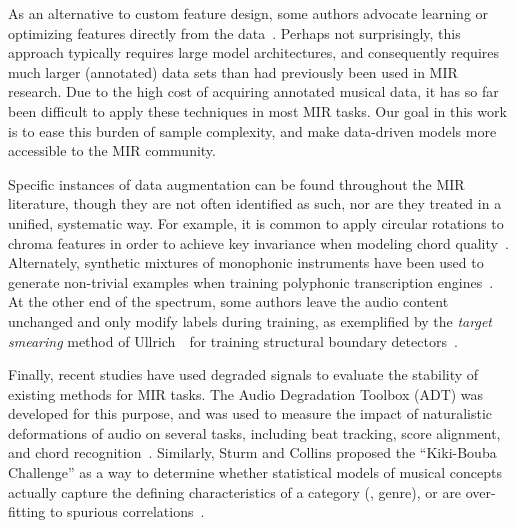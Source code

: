 \documentclass{article}
\begin{document}
%
%   
%
As an alternative to custom feature design, some authors advocate learning or optimizing
features directly from the data~\cite{humphrey2012moving}.  
Perhaps not surprisingly, this approach typically requires large model architectures, and 
consequently requires much larger (annotated) data sets than had previously been 
used in MIR research.  
Due to the high cost of acquiring annotated musical data, it has so far been difficult to
apply these techniques in most MIR tasks.
Our goal in this work is to ease this burden of sample complexity, and make 
data-driven models more accessible to the MIR community.

%
Specific instances of data augmentation can be found throughout the MIR literature,
though they are not often identified as such, nor are they treated in a unified,
systematic way.  For example, it is common to apply circular rotations to chroma features 
in order to achieve key invariance when modeling chord quality~\cite{lee2008acoustic}.
Alternately, synthetic mixtures of monophonic instruments have been used 
to generate non-trivial examples when training polyphonic transcription 
engines~\cite{kirchhoff2012multi}.
At the other end of the spectrum, some authors leave the audio content unchanged and 
only modify labels during training, as exemplified by the \emph{target smearing} 
method of Ullrich~\etal\ for training structural boundary 
detectors~\cite{ullrich2014boundary}.

%   
%   
Finally, recent studies have used degraded signals to evaluate the stability of
existing methods for MIR tasks.
The Audio Degradation Toolbox (ADT) was developed for this purpose, and was used
to measure the impact of naturalistic deformations of audio on several tasks, including
beat tracking, score alignment, and chord recognition~\cite{mauch2013audio}.
Similarly, Sturm and Collins proposed the ``Kiki-Bouba Challenge'' as a way to determine
whether statistical models of musical concepts actually capture the defining
characteristics of a category (\eg, genre), or are over-fitting to spurious
correlations~\cite{sturmkiki}.
\end{document}
